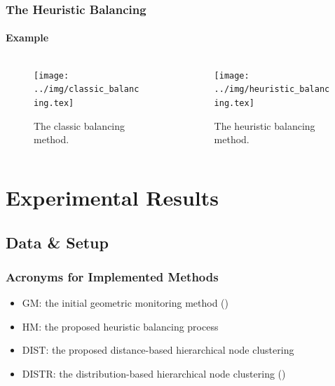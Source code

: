 \documentclass[hyperref={pdfpagelabels=false}]{beamer}
\begin{document}
\begin{frame}\frametitle{The Heuristic Balancing}\framesubtitle{Example}
\begin{columns}
\begin{column}[t]{0.5\linewidth}
\begin{figure}
\vspace{-1.2cm}
\texttt{[image: ../img/classic\_balancing.tex]}
\caption{The classic balancing method.} 
\end{figure}
\end{column}
\begin{column}[t]{0.5\linewidth}
\begin{figure}
\vspace{-1.2cm}
\texttt{[image: ../img/heuristic\_balancing.tex]}
\caption{The heuristic balancing method.} 
\end{figure}
\end{column}
\end{columns}
\end{frame}

\section{Experimental Results}
\begin{frame}
  \tableofcontents[currentsection]
\end{frame}

\subsection{Data \& Setup}
\begin{frame}\frametitle{Acronyms for Implemented Methods}
\begin{itemize}
\item[] GM: the initial geometric monitoring method {\tiny()}
\item[] HM: the proposed heuristic balancing process
\item[] DIST: the proposed distance-based hierarchical node clustering
\item[] DISTR: the distribution-based hierarchical node clustering {\tiny()}
\end{itemize}
\end{frame}
\end{document}
